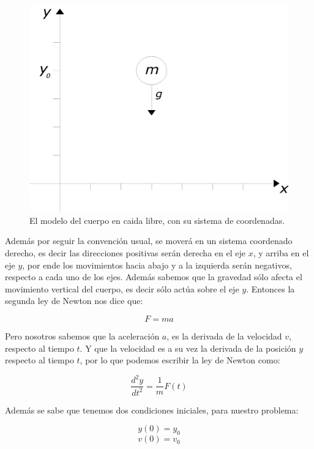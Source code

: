 \begin{figure}
 \centering
 \includegraphics[]{Img/cuerpo_caida}
 \caption[Diagrama de cuerpo libre]{ 
 El modelo del cuerpo en caida libre, con su sistema de coordenadas.
 } \label{cida:fig}
\end{figure}

Además por seguir la convención usual, se moverá en un sistema coordenado derecho, es decir las direcciones positivas serán derecha en el eje $x$, y arriba en el eje $y$, por ende los movimientos hacia abajo y a la izquierda serán negativos, respecto a cada uno de los ejes.
Además sabemos que la gravedad sólo afecta el movimiento vertical del cuerpo, es decir sólo actúa sobre el eje $y$.
Entonces la segunda ley de Newton nos dice que:

\begin{equation} 
F = m a
\end{equation} 

Pero nosotros sabemos que la aceleración $a$, es la derivada de la velocidad $v$, respecto al tiempo $t$.
Y que la velocidad es a su vez la derivada de la posición $y$ respecto al tiempo $t$, por lo que podemos escribir la ley de Newton como:

\begin{equation}
\label{ley:Newton}
 \frac{d^2y}{dt^2} = \frac{1}{m}F(t)
\end{equation}

Además se sabe que tenemos dos condiciones iniciales, para nuestro problema:

$$ y(0) = y_0 $$
$$ v(0) = v_0 $$

